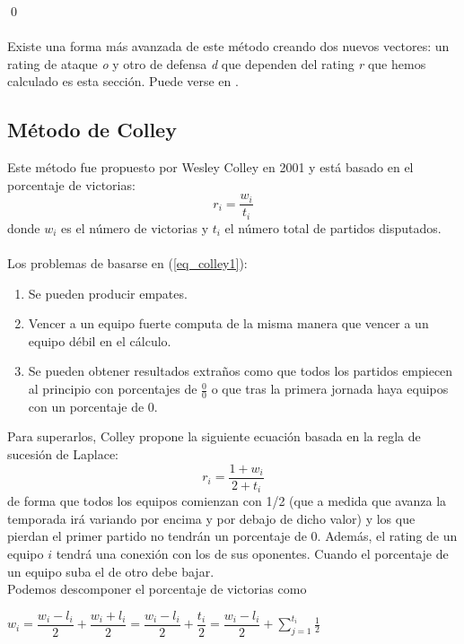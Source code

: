 \qed
\ \\
\ \\
Existe una forma más avanzada de este método creando dos nuevos vectores: un rating de ataque \textit{o} y otro de defensa \textit{d} que dependen del rating \textit{r} que hemos calculado es esta sección. Puede verse en \cite[pág 11-13]{cap2}.\\

\subsection{Método de Colley}
Este método fue propuesto por Wesley Colley en 2001 y está basado en el porcentaje de victorias:\\
\begin{equation} \label{eq_colley1}
	r_{i} = \dfrac{w_{i}}{t_{i}}
\end{equation}
donde $w_{i}$ es el número de victorias y $t_{i}$ el número total de partidos disputados.\\
\\
Los problemas de basarse en (\ref{eq_colley1}):
\begin{enumerate}
	\item Se pueden producir empates.
	\item Vencer a un equipo fuerte computa de la misma manera que vencer a un equipo débil en el cálculo.
	\item Se pueden obtener resultados extraños como que todos los partidos empiecen al principio con porcentajes de $\frac{0}{0}$ o que tras la primera jornada haya equipos con un porcentaje de 0.  
\end{enumerate}
Para superarlos, Colley propone la siguiente ecuación basada en la regla de sucesión de Laplace:
\begin{equation} \label{eq2.5}
	r_{i} = \dfrac{1+w_{i}}{2+t_{i}}
\end{equation}
de forma que todos los equipos comienzan con 1/2 (que a medida que avanza la temporada irá variando por encima y por debajo de dicho valor) y los que pierdan el primer partido no tendrán un porcentaje de 0. Además, el rating de un equipo $i$ tendrá una conexión con los de sus oponentes. Cuando el porcentaje de un equipo suba el de otro debe bajar.\\
Podemos descomponer el porcentaje de victorias como
\begin{center} 
	$ w_{i} = \dfrac{w_{i}-l_{i}}{2} + \dfrac{w_{i}+l_{i}}{2} = \dfrac{w_{i}-l_{i}}{2} + \dfrac{t_{i}}{2} = \dfrac{w_{i}-l_{i}}{2} + \sum\limits_{j=1}^{t_{i}} \frac{1}{2} $
\end{center}
